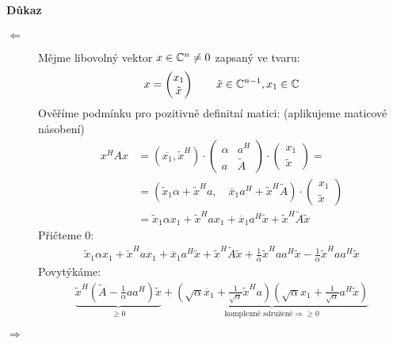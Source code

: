 \documentclass[a4paper,10pt]{article}
\begin{document}
\paragraph{Důkaz}
\begin{description}
\item[$\Leftarrow$]
Mějme libovolný vektor $x \in \mathbb{C}^n \neq 0$ zapsaný ve tvaru:
\begin{align}
	x = \left( \begin{matrix} x_1 \\ \tilde{x} \end{matrix}\right) \qquad \tilde{x} \in
	\mathbb{C}^{n-1}, x_1 \in \mathbb{C}
\end{align}
Ověříme podmínku pro pozitivně definitní matici: (aplikujeme maticové násobení)
\begin{align}
	x^HAx &= \left(\overline{x_1}, \tilde{x}^H\right) \cdot \left( \begin{matrix} \alpha &
	a^H \\ a & \tilde{A} \end{matrix} \right) \cdot \left( \begin{matrix} x_1 \\
	\tilde{x} \end{matrix} \right) = \\
	&=\left( \tilde{x}_1 \alpha + \tilde{x}^H a, \quad \overline{x}_1 a^H + \tilde{x}^H
	\tilde{A}\right) \cdot \left( \begin{matrix} x_1 \\ \tilde{x} \end{matrix} \right)
	 \\
	&=\tilde{x}_1\alpha x_1 + \tilde{x}^H a x_1 + \overline{x}_1 a^H \tilde{x} +
	\tilde{x}^H \tilde{A} \tilde{x} 
\end{align}
Přičteme $0$:
\begin{align}
	\tilde{x}_1\alpha x_1 + \tilde{x}^H a x_1 + \overline{x}_1 a^H \tilde{x} +
	\tilde{x}^H \tilde{A} \tilde{x} +
    \frac{1}{\alpha} \tilde{x}^H a a^H \tilde{x}
	- \frac{1}{\alpha} \tilde{x}^H a a^H \tilde{x}
\end{align}
Povytýkáme:
\begin{align}
	\underbrace{\tilde{x}^H\left( \tilde{A} - \frac{1}{\alpha} a a^H \right)
	\tilde{x}}_{\ge 0} +
	\underbrace{\left( \sqrt{\alpha} \overline{x}_1 + \frac{1}{\sqrt{\alpha}} \tilde{x}^Ha
	\right) \left(\sqrt{\alpha} x_1 + \frac{1}{\sqrt{\alpha}}
	a^H\tilde{x} \right)}_{\text{komplexně sdružené} \Rightarrow \ge 0}
\end{align}
\item[$\Rightarrow$] \ \\

\end{description}
\end{document}
